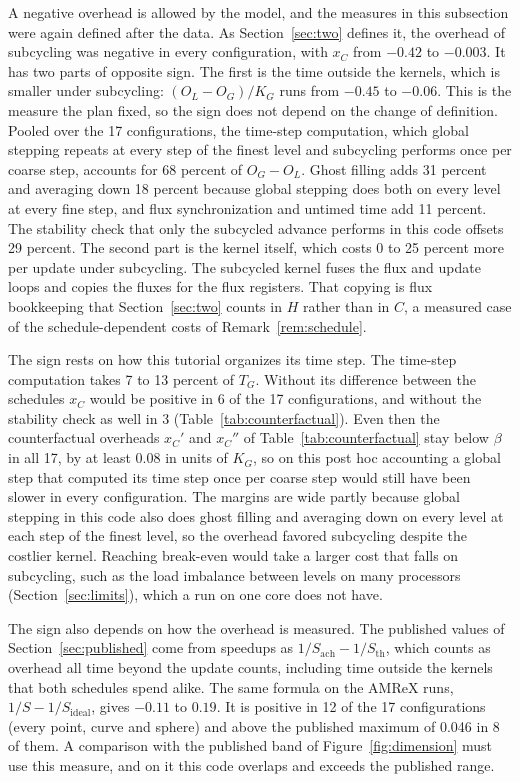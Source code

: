 \documentclass[12pt]{article}
\theoremstyle{remark}
\newcommand{\Sid}{S_{\mathrm{ideal}}}
\begin{document}
A negative overhead is allowed by the model, and the measures in this subsection were again defined after the data. As Section~\ref{sec:two} defines it, the overhead of subcycling was negative in every configuration, with $x_C$ from $-0.42$ to $-0.003$. It has two parts of opposite sign. The first is the time outside the kernels, which is smaller under subcycling: $(O_L-O_G)/K_G$ runs from $-0.45$ to $-0.06$. This is the measure the plan fixed, so the sign does not depend on the change of definition. Pooled over the 17 configurations, the time-step computation, which global stepping repeats at every step of the finest level and subcycling performs once per coarse step, accounts for 68 percent of $O_G-O_L$. Ghost filling adds 31 percent and averaging down 18 percent because global stepping does both on every level at every fine step, and flux synchronization and untimed time add 11 percent. The stability check that only the subcycled advance performs in this code offsets 29 percent. The second part is the kernel itself, which costs 0 to 25 percent more per update under subcycling. The subcycled kernel fuses the flux and update loops and copies the fluxes for the flux registers. That copying is flux bookkeeping that Section~\ref{sec:two} counts in $H$ rather than in $C$, a measured case of the schedule-dependent costs of Remark~\ref{rem:schedule}.

The sign rests on how this tutorial organizes its time step. The time-step computation takes 7 to 13 percent of $T_G$. Without its difference between the schedules $x_C$ would be positive in 6 of the 17 configurations, and without the stability check as well in 3 (Table~\ref{tab:counterfactual}). Even then the counterfactual overheads $x_C'$ and $x_C''$ of Table~\ref{tab:counterfactual} stay below $\beta$ in all 17, by at least 0.08 in units of $K_G$, so on this post hoc accounting a global step that computed its time step once per coarse step would still have been slower in every configuration. The margins are wide partly because global stepping in this code also does ghost filling and averaging down on every level at each step of the finest level, so the overhead favored subcycling despite the costlier kernel. Reaching break-even would take a larger cost that falls on subcycling, such as the load imbalance between levels on many processors (Section~\ref{sec:limits}), which a run on one core does not have.

The sign also depends on how the overhead is measured. The published values of Section~\ref{sec:published} come from speedups as $1/S_{\mathrm{ach}}-1/S_{\mathrm{th}}$, which counts as overhead all time beyond the update counts, including time outside the kernels that both schedules spend alike. The same formula on the AMReX runs, $1/S-1/\Sid$, gives $-0.11$ to $0.19$. It is positive in 12 of the 17 configurations (every point, curve and sphere) and above the published maximum of 0.046 in 8 of them. A comparison with the published band of Figure~\ref{fig:dimension} must use this measure, and on it this code overlaps and exceeds the published range.
\end{document}
